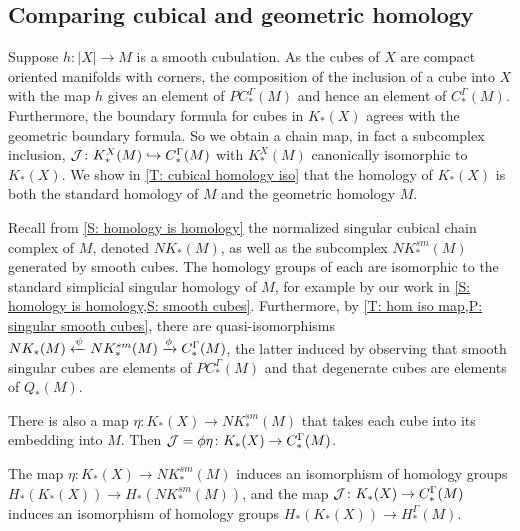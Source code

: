 \subsection{Comparing cubical and geometric homology}\label{S: cubical and geometric homology}

Suppose $h \colon |X| \to M$ is a smooth cubulation.
As the cubes of $X$ are compact oriented manifolds with corners, the composition of the inclusion of a cube into $X$ with the map $h$ gives an element of $PC_*^\Gamma(M)$ and hence an element of $C_*^\Gamma(M)$.
Furthermore, the boundary formula for cubes in $K_*(X)$ agrees with the geometric boundary formula.
So we obtain a chain map, in fact a subcomplex inclusion, $\mathcal{J} \colon K^X_*(M) \hookrightarrow C^\Gamma_*(M)$ with $K_*^X(M)$ canonically isomorphic to $K_*(X)$.
We show in \cref{T: cubical homology iso} that the homology of $K_*(X)$ is both the standard homology of $M$ and the geometric homology $M$.

Recall from \cref{S: homology is homology} the normalized singular cubical chain complex of $M$, denoted $NK_*(M)$, as well as the subcomplex $NK^{sm}_*(M)$ generated by smooth cubes.
The homology groups of each are isomorphic to the standard simplicial singular homology of $M$, for example by our work in \cref{S: homology is homology,S: smooth cubes}.
Furthermore, by \cref{T: hom iso map,P: singular smooth cubes}, there are quasi-isomorphisms $NK_*(M) \xleftarrow{\psi} NK^{sm}_*(M) \xrightarrow{\phi} C^\Gamma_*(M)$, the latter induced by observing that smooth singular cubes are elements of $PC^\Gamma_*(M)$ and that degenerate cubes are elements of $Q_*(M)$.

There is also a map $\eta: K_*(X) \to NK^{sm}_*(M)$ that takes each cube into its embedding into $M$.
Then $\mathcal{J} = \phi\eta \colon K_*(X) \to C^\Gamma_*(M)$.


\begin{theorem}\label{T: cubical homology iso}
	The map $\eta: K_*(X) \to NK^{sm}_*(M)$ induces an isomorphism of homology groups $H_*(K_*(X)) \to H_*(NK^{sm}_*(M))$, and the map $\mathcal{J} \colon K_*(X) \to C^\Gamma_*(M)$ induces an isomorphism of homology groups $H_*(K_*(X)) \to H_*^\Gamma(M)$.
\end{theorem}

